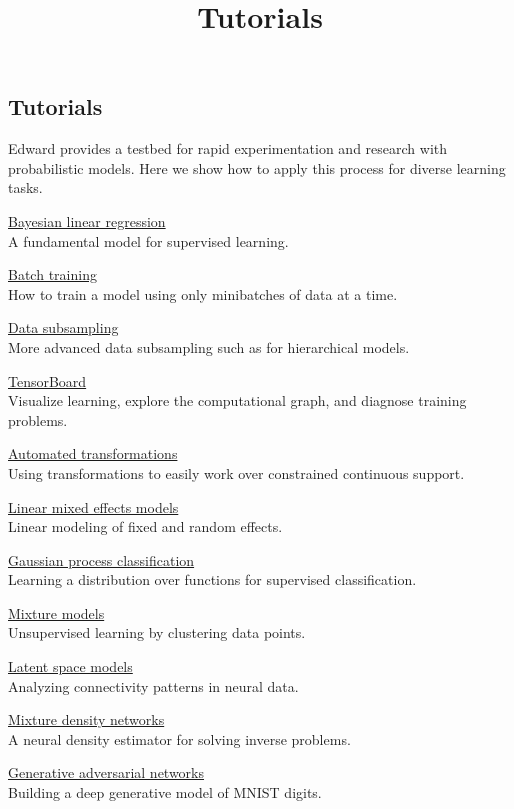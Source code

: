 \title{Tutorials}

\subsection{Tutorials}

Edward provides a testbed for rapid experimentation and research with
probabilistic models. Here we show how to apply this process for
diverse learning tasks.

\href{supervised-regression}{Bayesian linear regression} \\
A fundamental model for supervised learning.

\href{batch-training}{Batch training} \\
How to train a model using only minibatches of data at a time.

\href{data-subsampling}{Data subsampling} \\
More advanced data subsampling such as for hierarchical models.

\href{tensorboard}{TensorBoard} \\
Visualize learning, explore the computational graph, and diagnose training problems.

\href{automated-transformations}{Automated transformations} \\
Using transformations to easily work over constrained continuous support.

\href{linear-mixed-effects-models}{Linear mixed effects models} \\
Linear modeling of fixed and random effects.

\href{supervised-classification}{Gaussian process classification} \\
Learning a distribution over functions for supervised classification.

\href{unsupervised}{Mixture models} \\
Unsupervised learning by clustering data points.

\href{latent-space-models}{Latent space models} \\
Analyzing connectivity patterns in neural data.

\href{mixture-density-network}{Mixture density networks} \\
A neural density estimator for solving inverse problems.

\href{gan}{Generative adversarial networks} \\
Building a deep generative model of MNIST digits.

